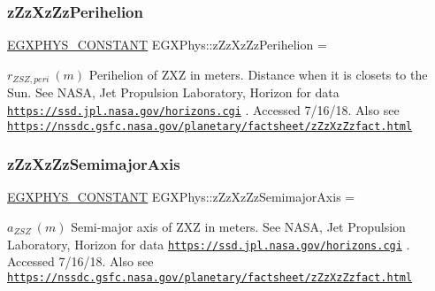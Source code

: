 \subsubsection{\texorpdfstring{z\+Zz\+Xz\+Zz\+Perihelion}{zZzXzZzPerihelion}}
{\footnotesize\ttfamily \mbox{\hyperlink{group___e_g_x_phys-_constants-_macros_ga76980d288494ce1714c9ac68a95ba702}{E\+G\+X\+P\+H\+Y\+S\+\_\+\+C\+O\+N\+S\+T\+A\+NT}} E\+G\+X\+Phys\+::z\+Zz\+Xz\+Zz\+Perihelion =}

$ r_{ZSZ,peri} \ (m)$ Perihelion of Z\+XZ in meters. Distance when it is closets to the Sun. See N\+A\+SA, Jet Propulsion Laboratory, Horizon for data \href{https://ssd.jpl.nasa.gov/horizons.cgi}{\tt https\+://ssd.\+jpl.\+nasa.\+gov/horizons.\+cgi} . Accessed 7/16/18. Also see \href{https://nssdc.gsfc.nasa.gov/planetary/factsheet/zZzXzZzfact.html}{\tt https\+://nssdc.\+gsfc.\+nasa.\+gov/planetary/factsheet/z\+Zz\+Xz\+Zzfact.\+html} \mbox{\label{group___e_g_x_phys-_constants-_astrophysics-_solar_system-_z_x_z-_orbit_ga2992d483d551b1b6f226187deac8e2b9}} 
\subsubsection{\texorpdfstring{z\+Zz\+Xz\+Zz\+Semimajor\+Axis}{zZzXzZzSemimajorAxis}}
{\footnotesize\ttfamily \mbox{\hyperlink{group___e_g_x_phys-_constants-_macros_ga76980d288494ce1714c9ac68a95ba702}{E\+G\+X\+P\+H\+Y\+S\+\_\+\+C\+O\+N\+S\+T\+A\+NT}} E\+G\+X\+Phys\+::z\+Zz\+Xz\+Zz\+Semimajor\+Axis =}

$ a_{ZSZ} \ (m)$ Semi-\/major axis of Z\+XZ in meters. See N\+A\+SA, Jet Propulsion Laboratory, Horizon for data \href{https://ssd.jpl.nasa.gov/horizons.cgi}{\tt https\+://ssd.\+jpl.\+nasa.\+gov/horizons.\+cgi} . Accessed 7/16/18. Also see \href{https://nssdc.gsfc.nasa.gov/planetary/factsheet/zZzXzZzfact.html}{\tt https\+://nssdc.\+gsfc.\+nasa.\+gov/planetary/factsheet/z\+Zz\+Xz\+Zzfact.\+html} \mbox{\label{group___e_g_x_phys-_constants-_astrophysics-_solar_system-_z_x_z-_orbit_ga00bc8df59581966b8ae3ee688a792d6c}} 
